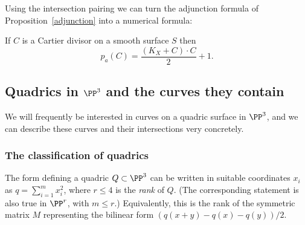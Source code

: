 Using the intersection pairing we can turn the adjunction formula of Proposition~\ref{adjunction} into a numerical formula:

\begin{theorem}\label{adjunction formula} 
If $C$ is a Cartier divisor on a smooth surface $S$ then\label{genus formula}
$$
p_a(C) = \frac{(K_X+C)\cdot C}{2} +1.
 $$
\end{theorem}

%
%




\subsection{Quadrics in $\PP^3$ and the curves they contain}\label{Div of quadric}
 
 We will frequently be interested in curves on a quadric surface in $\PP^3$, and we can describe these
curves and their intersections very concretely.

\subsubsection{The classification of quadrics} The form defining a quadric $Q\subset \PP^{3}$ can be written in suitable
coordinates $x_{i}$ as $q = \sum_{i=1}^{m} x_{i}^{2}$, where $r\leq 4$ is the \emph{rank} of $Q$. (The corresponding
statement is also true in $\PP^{r}$, with $m\leq r$.) Equivalently, this is the rank of the symmetric matrix $M$
representing the bilinear form $(q(x+y)-q(x)-q(y))/2$.

